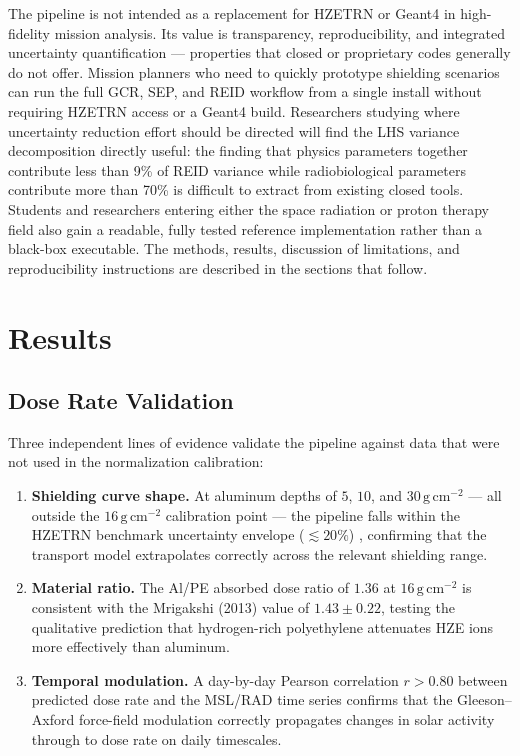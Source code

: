 \documentclass[12pt,letterpaper]{article}
\newcommand{\gcm}{\,\mathrm{g\,cm^{-2}}}
\begin{document}
The pipeline is not intended as a replacement for HZETRN or Geant4 in
high-fidelity mission analysis.
Its value is transparency, reproducibility, and integrated uncertainty
quantification — properties that closed or proprietary codes generally
do not offer.
Mission planners who need to quickly prototype shielding scenarios can
run the full GCR, SEP, and REID workflow from a single install without
requiring HZETRN access or a Geant4 build.
Researchers studying where uncertainty reduction effort should be
directed will find the LHS variance decomposition directly useful: the
finding that physics parameters together contribute less than 9\% of
REID variance while radiobiological parameters contribute more than 70\%
is difficult to extract from existing closed tools.
Students and researchers entering either the space radiation or proton
therapy field also gain a readable, fully tested reference implementation
rather than a black-box executable.
The methods, results, discussion of limitations, and reproducibility
instructions are described in the sections that follow.




\section{Results}
\label{sec:results}

\subsection{Dose Rate Validation}
\label{sec:validation}

Three independent lines of evidence validate the pipeline against data
that were not used in the normalization calibration:
\begin{enumerate}
  \item \textbf{Shielding curve shape.}
        At aluminum depths of $5$, $10$, and $30\gcm$ — all outside the
        $16\gcm$ calibration point — the pipeline falls within the HZETRN
        benchmark uncertainty envelope ($\lesssim 20\%$) \citep{slaba2014},
        confirming that the transport model extrapolates correctly
        across the relevant shielding range.
  \item \textbf{Material ratio.}
        The Al/PE absorbed dose ratio of $1.36$ at $16\gcm$ is consistent
        with the Mrigakshi (2013) value of $1.43 \pm 0.22$, testing the
        qualitative prediction that hydrogen-rich polyethylene attenuates
        HZE ions more effectively than aluminum.
  \item \textbf{Temporal modulation.}
        A day-by-day Pearson correlation $r > 0.80$ between predicted dose
        rate and the MSL/RAD time series confirms that the Gleeson--Axford
        force-field modulation correctly propagates changes in solar activity
        through to dose rate on daily timescales.
\end{enumerate}
\end{document}
